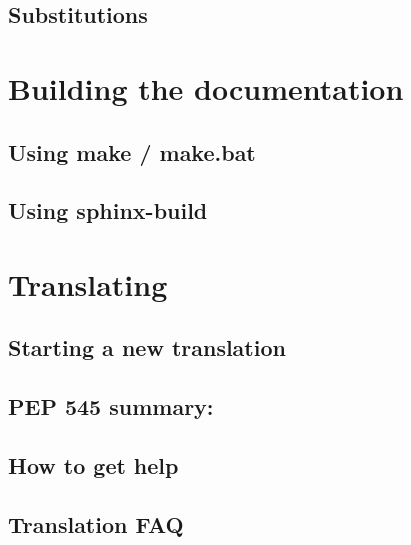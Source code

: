 \documentclass[]{book}
\begin{document}
\hypertarget{substitutions}{%
\subsection{Substitutions}\label{substitutions}}

\hypertarget{building-the-documentation}{%
\section{Building the documentation}\label{building-the-documentation}}

\hypertarget{using-make-make.bat}{%
\subsection{Using make / make.bat}\label{using-make-make.bat}}

\hypertarget{using-sphinx-build}{%
\subsection{Using sphinx-build}\label{using-sphinx-build}}

\hypertarget{translating}{%
\section{Translating}\label{translating}}

\hypertarget{starting-a-new-translation}{%
\subsection{Starting a new translation}\label{starting-a-new-translation}}

\hypertarget{pep-545-summary}{%
\subsection{PEP 545 summary:}\label{pep-545-summary}}

\hypertarget{how-to-get-help}{%
\subsection{How to get help}\label{how-to-get-help}}

\hypertarget{translation-faq}{%
\subsection{Translation FAQ}\label{translation-faq}}
\end{document}
